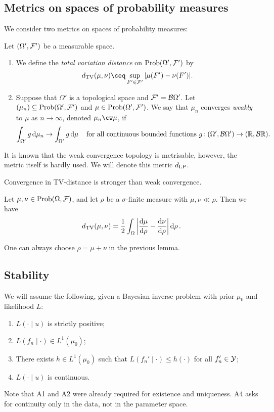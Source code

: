 \subsection{Metrics on spaces of probability measures}
We consider two metrics on spaces of probability measures:
\begin{definition}
	Let $(\Omega', \mathcal F')$ be a measurable space.
	\begin{enumerate}
		\item We define the \emph{total variation distance} on $\operatorname{Prob}(\Omega', \mathcal F')$ by
		\[
		d_\Rm{TV}(\mu, \nu)  \ceq \sup_{F' \in \FF'} \abs{\mu(F') - \nu(F')}. 
		\]
		\item Suppose that $\Omega'$ is a topological space and $\mathcal F'=\mathcal B\Omega'$. Let $(\mu_n) \subseteq \operatorname{Prob}(\Omega', \mathcal F')$  and $\mu \in \operatorname{Prob}(\Omega', \mathcal F')$. We say that $\mu_n$ converges \emph{weakly} to $\mu$ as $n\to\infty$, denoted $\mu_n \cw \mu$, if
		\[
		\int_{\Omega'} g \dd{\mu_n} \to \int_{\Omega'} g \dd{\mu} \quad\text{for all continuous bounded functions } g \colon (\Omega', \mathcal B\Omega') \to (\mathbb R, \mathcal B\mathbb R). 
		\]
	\end{enumerate}
\end{definition}

It is known that the weak convergence topology is metrisable, however, the metric itself is hardly used. We will denote this metric $d_\mathrm{LP}$.  

\begin{lemma}
	Convergence in TV-distance is stronger than weak convergence. 
\end{lemma}

\begin{lemma} \label{lem:tv_distance_formulation}
	Let $\mu, \nu \in \operatorname{Prob}(\Omega, \mathcal F)$, and let $\rho$ be a $\sigma$-finite measure with $\mu, \nu \ll\rho$. Then we have
	\[
	d_\mathrm{TV}(\mu, \nu) = \frac12 \int_\Omega \abs{\dv{\mu}{\rho} - \dv{\nu}{\rho}}\dd{\rho}. 
	\]
\end{lemma}
One can always choose $\rho = \mu + \nu$ in the previous lemma. 

\subsection{Stability}
We will assume the following, given a Bayesian inverse problem with prior $\mu_0$ and likelihood $L$:
\begin{enumerate} [{A}1]
	\item $L(\cdot \mid u)$ is strictly positive;
	\item $L(f_n \mid \cdot) \in L^1(\mu_0)$;
	\item There exists $h \in L^1(\mu_0)$ such that $L(f_n'\mid \cdot) \leq h(\cdot)$ for all $f_n' \in \mathcal Y$;
	\item $L(\cdot \mid u)$ is continuous.
\end{enumerate}
Note that A1 and A2 were already required for existence and uniqueness. A4 asks for continuity only in the data, not in the parameter space. 

